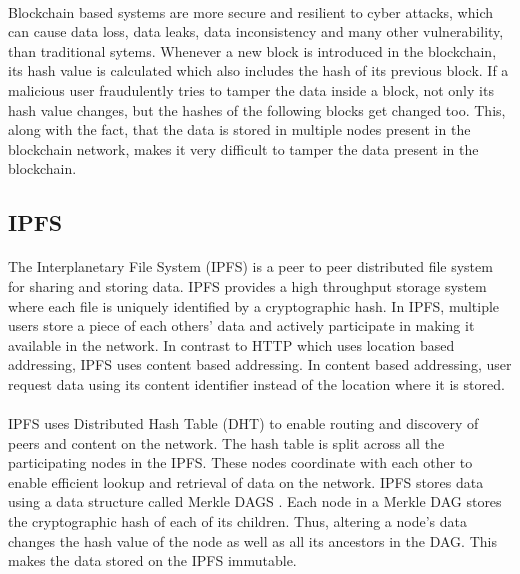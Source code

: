 \documentclass{article}
\begin{document}
        \paragraph{}
        Blockchain based systems are more secure and resilient to cyber attacks, which can cause data loss, data leaks, data inconsistency and many other vulnerability, than traditional sytems. Whenever a new block is introduced in the blockchain, its hash value is calculated which also includes the hash of its previous block. If a malicious user fraudulently tries to tamper the data inside a block, not only its hash value changes, but the hashes of the following blocks get changed too. This, along with the fact, that the data is stored in multiple nodes present in the blockchain network, makes it very difficult to tamper the data present in the blockchain.
        
        \paragraph{}

    \subsection{IPFS}

        \paragraph{}
        The Interplanetary File System (IPFS) \cite{IPFS} is a peer to peer distributed file system for sharing and storing data. IPFS provides a high throughput storage system where each file is uniquely identified by a cryptographic hash. In IPFS, multiple users store a piece of each others' data and actively participate in making it available in the network. In contrast to HTTP which uses location based addressing, IPFS uses content based addressing. In content based addressing, user request data using its content identifier instead of the location where it is stored.

        \paragraph{}
        IPFS uses Distributed Hash Table (DHT) \cite{DHT} to enable routing and discovery of peers and content on the network. The hash table is split across all the participating nodes in the IPFS. These nodes coordinate with each other to enable efficient lookup and retrieval of data on the network. IPFS stores data using a data structure called Merkle DAGS \cite{IPFS}. Each node in a Merkle DAG stores the cryptographic hash of each of its children. Thus, altering a node's data changes the hash value of the node as well as all its ancestors in the DAG. This makes the data stored on the IPFS immutable.
        
\end{document}
